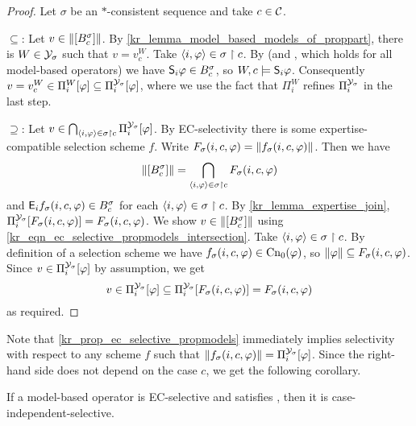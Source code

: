 \begin{proof}
    Let $\sigma$ be an $\ast$-consistent sequence and take $c \in \C$.

    $\subseteq$: Let $v \in \propmods{\proppart{B^\sigma_c}}$. By
    \cref{kr_lemma_model_based_models_of_proppart}, there is $W \in \Y_\sigma$
    such that $v = v^W_c$. Take $\tuple{i, \phi} \in \sigma \rs c$. By
    \soundness{} (and \containment{}, which holds for all model-based
    operators) we have $\S_i\phi \in B^\sigma_c$, so $W, c \models \S_i\phi$.
    Consequently $v = v^W_c \in \Pi^W_i[\phi] \subseteq
    \Pi^{\Y_\sigma}_i[\phi]$, where we use the fact that $\Pi^W_i$ refines
    $\Pi^{\Y_\sigma}_i$ in the last step.

    $\supseteq$: Let $v \in \bigcap_{\tuple{i, \phi} \in \sigma \rs
    c}{\Pi^{\Y_\sigma}_i[\phi]}$. By EC-selectivity there is some
    expertise-compatible selection scheme $f$. Write $F_\sigma(i, c, \phi) =
    \propmods{f_\sigma(i, c, \phi)}$. Then we have
    \begin{equation}
        \label{kr_eqn_ec_selective_propmodels_intersection}
        \propmods{\proppart{B^\sigma_c}}
        = \bigcap_{\tuple{i, \phi} \in \sigma \rs c}{
            F_\sigma(i, c, \phi)
        }
    \end{equation}
    and $\E_i{f_\sigma(i, c, \phi)} \in B^\sigma_c$ for each $\tuple{i, \phi}
    \in \sigma \rs c$. By \cref{kr_lemma_expertise_join},
    $\Pi^{\Y_\sigma}_i[F_\sigma(i, c, \phi)] = F_\sigma(i, c, \phi)$. We show
    $v \in \propmods{\proppart{B^\sigma_c}}$ using
    \cref{kr_eqn_ec_selective_propmodels_intersection}. Take $\tuple{i, \phi}
    \in \sigma \rs c$. By definition of a selection scheme we have $f_\sigma(i,
    c, \phi) \in \cnprop(\phi)$, so $\propmods{\phi} \subseteq F_\sigma(i, c,
    \phi)$. Since $v \in \Pi^{\Y_\sigma}_i[\phi]$ by assumption, we get
    \[
        v
        \in \Pi^{\Y_\sigma}_i[\phi]
        \subseteq \Pi^{\Y_\sigma}_i[F_\sigma(i, c, \phi)]
        = F_\sigma(i, c, \phi)
    \]
    as required.
\end{proof}

Note that \cref{kr_prop_ec_selective_propmodels} immediately implies
selectivity with respect to any scheme $f$ such that $\propmods{f_\sigma(i, c,
\phi)} = \Pi^{\Y_\sigma}_i[\phi]$. Since the right-hand side does not depend on
the case $c$, we get the following corollary.

\begin{corollary}
    \label{kr_cor_ec_selective_ci}
    If a model-based operator is EC-selective and satisfies \soundness{}, then
    it is case-independent-selective.
\end{corollary}

